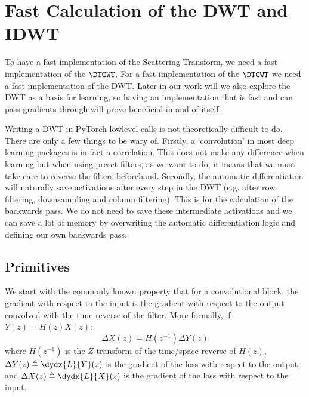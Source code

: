 \section{Fast Calculation of the DWT and IDWT}\label{sec:ch3:dwt}
\begin{figure}
  \centering
  
  \label{fig:ch3:dwt}
\end{figure}

To have a fast implementation of the Scattering Transform, we need a fast
implementation of the $\DTCWT$. For a fast implementation of the $\DTCWT$ we
need a fast implementation of the DWT. Later in our work will we also explore
the DWT as a basis for learning, so having an implementation that is fast and
can pass gradients through will prove beneficial in and of itself.

Writing a DWT in PyTorch lowlevel calls is not theoretically difficult to do.
There are only a few things to be wary of. Firstly, a `convolution' in most deep
learning packages is in fact a correlation. This does not make any difference
when learning but when using preset filters, as we want to do, it means that we
must take care to reverse the filters beforehand. Secondly, the automatic 
differentiation will naturally save activations after every step in the DWT
(e.g. after row filtering, downsampling and column filtering). This is for the
calculation of the backwards pass. We do not need to save these intermediate
activations and we can save a lot of memory by overwriting the automatic
differentiation logic and defining our own backwards pass.

\subsection{Primitives}
We start with the commonly known property that for a convolutional block, the
gradient with respect to the input is the gradient with respect to the output
convolved with the time reverse of the filter. More formally, if 
$Y(z) = H(z) X(z)$:
%
\begin{equation}\label{eq:ch3:backprop}
  \Delta X(z) = H(z^{-1}) \Delta Y(z)
\end{equation}
%
where $H(z^{-1})$ is the $Z$-transform of the time/space reverse of $H(z)$,
$\Delta Y(z) \triangleq \dydx{L}{Y}(z)$ is the gradient of the loss with respect
to the output, and $\Delta X(z) \triangleq \dydx{L}{X}(z)$ is the gradient of
the loss with respect to the input. 


